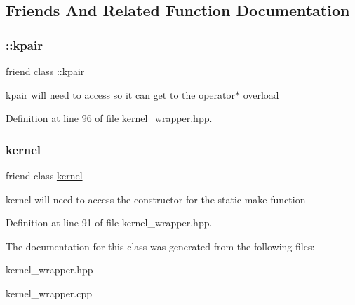 \subsection{Friends And Related Function Documentation}
\hypertarget{classraft_1_1kernel__wrapper_ae07b02dff85bd74c2d4d69d55bafe0a2}{}\label{classraft_1_1kernel__wrapper_ae07b02dff85bd74c2d4d69d55bafe0a2} 
\subsubsection{\texorpdfstring{\+::kpair}{::kpair}}
{\footnotesize\ttfamily friend class \+::\hyperlink{classkpair}{kpair}\hspace{0.3cm}{\ttfamily [friend]}}

kpair will need to access so it can get to the operator$\ast$ overload 

Definition at line 96 of file kernel\+\_\+wrapper.\+hpp.

\hypertarget{classraft_1_1kernel__wrapper_aaae51189d6e1e8b24b5654e3704ff50b}{}\label{classraft_1_1kernel__wrapper_aaae51189d6e1e8b24b5654e3704ff50b} 
\subsubsection{\texorpdfstring{kernel}{kernel}}
{\footnotesize\ttfamily friend class \hyperlink{classraft_1_1kernel}{kernel}\hspace{0.3cm}{\ttfamily [friend]}}

kernel will need to access the constructor for the static make function 

Definition at line 91 of file kernel\+\_\+wrapper.\+hpp.



The documentation for this class was generated from the following files\+:\begin{DoxyCompactItemize}
\item 
kernel\+\_\+wrapper.\+hpp\item 
kernel\+\_\+wrapper.\+cpp\end{DoxyCompactItemize}
